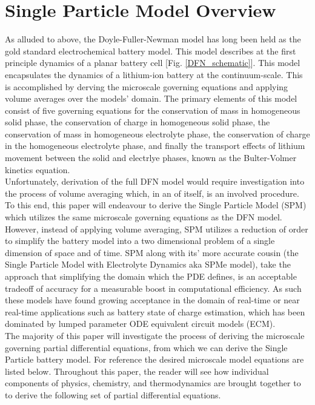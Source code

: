 \documentclass[lettersize,journal]{IEEEtran}
\begin{document}
\section{Single Particle Model Overview}
As alluded to above, the Doyle-Fuller-Newman model has long been held as the gold standard electrochemical battery model. This model describes at the first principle dynamics of a planar battery cell [Fig. \ref{DFN_schematic}]. This model encapsulates the dynamics of a lithium-ion battery at the continuum-scale. This is accomplished by derving the microscale governing equations and applying volume averages over the models' domain. The primary elements of this model consist of five governing equations for the conservation of mass in homogeneous solid phase, the conservation of charge in homogeneous solid phase, the conservation of mass in homogeneous electrolyte phase, the conservation of charge in the homogeneous electrolyte phase, and finally the transport effects of lithium movement between the solid and electrlye phases, known as the Bulter-Volmer kinetics equation. \\

Unfortunately, derivation of the full DFN model would require investigation into the process of volume averaging which, in an of itself, is an involved procedure. To this end, this paper will endeavour to derive the Single Particle Model (SPM) which utilizes the same microscale governing equations as the DFN model. However, instead of applying volume averaging, SPM utilizes a reduction of order to simplify the battery model into a two dimensional problem of a single dimension of space and of time. SPM along with its' more accurate cousin (the Single Particle Model with Electrolyte Dynamics aka SPMe model), take the approach that simplifying the domain which the PDE defines, is an acceptable tradeoff of accuracy for a measurable boost in computational efficiency. As such these models have found growing acceptance in the domain of real-time or near real-time applications such as battery state of charge estimation, which has been dominated by lumped parameter ODE equivalent circuit models (ECM). \\

 The majority of this paper will investigate the process of deriving the microscale governing partial differential equations, from which we can derive the Single Particle battery model. For reference the desired microscale model equations are listed below. Throughout this paper, the reader will see how individual components of physics, chemistry, and thermodynamics are brought together to to derive the following set of partial differential equations.
\end{document}
